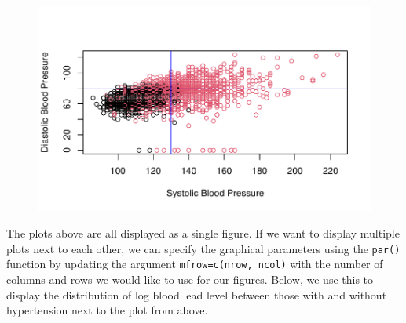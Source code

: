 \documentclass[
  letterpaper,
]{krantz}
\makeatletter
\newenvironment{Shaded}{\begin{snugshade}}{\end{snugshade}}
\newcommand{\AttributeTok}[1]{\textcolor[rgb]{0.40,0.45,0.13}{#1}}
\newcommand{\DecValTok}[1]{\textcolor[rgb]{0.68,0.00,0.00}{#1}}
\newcommand{\FunctionTok}[1]{\textcolor[rgb]{0.28,0.35,0.67}{#1}}
\newcommand{\NormalTok}[1]{\textcolor[rgb]{0.00,0.23,0.31}{#1}}
\newcommand{\SpecialCharTok}[1]{\textcolor[rgb]{0.37,0.37,0.37}{#1}}
\newcommand{\StringTok}[1]{\textcolor[rgb]{0.13,0.47,0.30}{#1}}
\newenvironment{kframe}{%
\medskip{}
\setlength{\fboxsep}{.8em}
 \def\at@end@of@kframe{}%
 \ifinner\ifhmode%
  \def\at@end@of@kframe{\end{minipage}}%
  \begin{minipage}{\columnwidth}%
 \fi\fi%
 \def\FrameCommand##1{\hskip\@totalleftmargin \hskip-\fboxsep
 \colorbox{shadecolor}{##1}\hskip-\fboxsep
     \hskip-\linewidth \hskip-\@totalleftmargin \hskip\columnwidth}%
 \MakeFramed {\advance\hsize-\width
   \@totalleftmargin\z@ \linewidth\hsize
   \@setminipage}}%
 {\par\unskip\endMakeFramed%
 \at@end@of@kframe}
\renewenvironment{Shaded}{\begin{kframe}}{\end{kframe}}
\makeatother
\begin{document}
\begin{Shaded}
\end{Shaded}

\begin{figure}[H]

{\centering \includegraphics[width=1\textwidth,height=\textheight]{book/4_exploratory_analysis_files/figure-pdf/unnamed-chunk-19-1.pdf}

}

\end{figure}

The plots above are all displayed as a single figure. If we want to
display multiple plots next to each other, we can specify the graphical
parameters using the \texttt{par()} function by updating the argument
\texttt{mfrow=c(nrow,\ ncol)} with the number of columns and rows we
would like to use for our figures. Below, we use this to display the
distribution of log blood lead level between those with and without
hypertension next to the plot from above.
\end{document}
